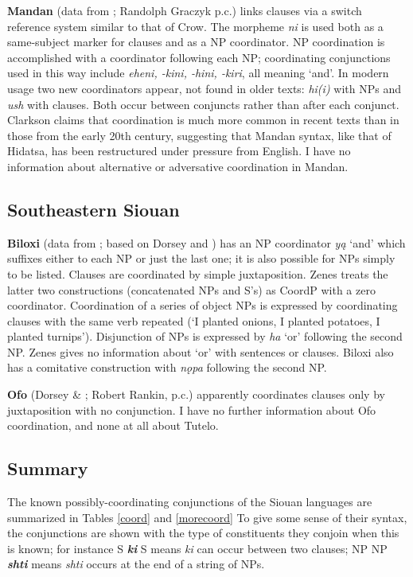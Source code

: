 \documentclass[output=paper]{LSP/langsci}
\begin{document}
\textbf{Mandan} (data from \citealt{Clarkson2012}; Randolph Graczyk p.c.) links clauses via a switch reference system similar to that of Crow. The morpheme \textit{ni} is used both as a same-subject marker for clauses and as a NP coordinator. NP coordination is accomplished with a coordinator following each NP; coordinating conjunctions used in this way include \textit{eheni, -kini, -hini, -kiri}, all meaning `and'. In modern usage two new coordinators appear, not found in older texts: \textit{hi(i)} with NPs and \textit{ush} with clauses. Both occur between conjuncts rather than after each conjunct. Clarkson claims that coordination is much more common in recent texts than in those from the early 20th century, suggesting that Mandan syntax, like that of Hidatsa, has been restructured under pressure from English. I have no information about alternative or adversative coordination in Mandan.  

\subsection{Southeastern Siouan}
 
\textbf{Biloxi} (data from \citealt{Zenes2009}; based on Dorsey and \citealt{Swanton1912}) has an NP coordinator \textit{y\k{a}} `and' which suffixes either to each NP or just the last one; it is also possible for NPs simply to be listed. Clauses are coordinated by simple juxtaposition. Zenes treats the latter two constructions (concatenated NPs and S's) as CoordP with a zero coordinator. Coordination of a series of object NPs is expressed by coordinating clauses with the same verb repeated (`I planted onions, I planted potatoes, I planted turnips'). Disjunction of NPs is expressed by \textit{ha} `or' following the second NP. Zenes gives no information about `or' with sentences or clauses. Biloxi also has a comitative construction with \textit{n\k{o}pa} following the second NP.

\textbf{Ofo} (Dorsey \& \citealt{Swanton1912}; Robert Rankin, p.c.) apparently coordinates clauses only by juxtaposition with no conjunction. I have no further information about Ofo coordination, and none at all about Tutelo.

\subsection{Summary}

The known possibly-coordinating conjunctions of the Siouan languages are summarized in Tables \ref{coord} and \ref{morecoord} To give some sense of their syntax, the conjunctions are shown with the type of constituents they conjoin when this is known; for instance S \textit{\textbf{ki}} S means \textit{ki} can occur between two clauses; NP NP \textit{\textbf {shti}} means \textit {shti} occurs at the end of a string of NPs.
\end{document}
